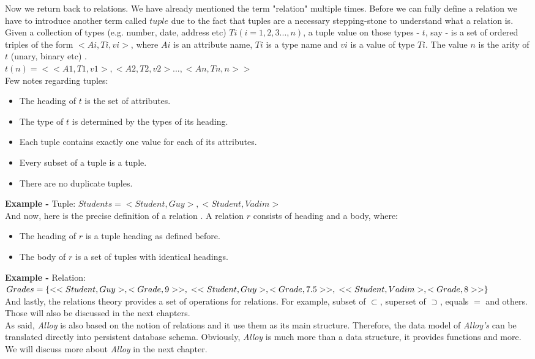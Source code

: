 \documentclass[oneside]{book}
\begin{document}
Now we return back to relations. We have already mentioned the term "relation" multiple times. Before we can fully define a relation we have to introduce another term called $tuple$ due to the fact that tuples are a necessary stepping-stone to understand what a relation is.  Given a collection of types (e.g. number, date, address etc) $Ti(i=1,2,3...,n)$, a tuple value on those types - $t$, say - is a set of ordered triples of the form $<Ai,Ti,vi>$, where $Ai$ is an attribute name, $Ti$ is a type name and $vi$ is a value of type $Ti$. The value $n$ is the arity of $t$ (unary, binary etc) \cite[p.~142]{introtodb}.\\
$t(n)=<<A1, T1, v1>, <A2, T2, v2>..., <An, Tn, n>>$\\
Few notes regarding tuples:
\begin{itemize}
	\item The heading of $t$ is the set of attributes.
	\item The type of $t$ is determined by the types of its heading.
	\item Each tuple contains exactly one value for each of its attributes.
	\item Every subset of a tuple is a tuple.
	\item There are no duplicate tuples.
\end{itemize}
\textbf{Example -} Tuple: $Students = {<Student, Guy>, <Student, Vadim>}$\\
And now, here is the precise definition of a relation \cite[p.~146]{introtodb}. A relation $r$ consists of heading and a body, where:
\begin{itemize}
	\item The heading of $r$ is a tuple heading as defined before.
	\item The body of $r$ is a set of tuples with identical headings.
\end{itemize}
\textbf{Example -} Relation: 
$Grades = \{<<Student, Guy>, <Grade, 9>>,\\
<<Student, Guy>, <Grade, 7.5>>,\\
<<Student, Vadim>, <Grade, 8>>\}$\\

And lastly, the relations theory provides a set of operations for relations. For example, subset of $\subset$, superset of $\supset$, equals $=$ and others. Those will also be discussed in the next chapters.\\

As said, \textit{Alloy} is also based on the notion of relations and it use them as its main structure. Therefore, the data model of \textit{Alloy's} can be translated directly into persistent database schema. Obviously, \textit{Alloy} is much more than a data structure, it provides functions and more. We will discuss more about \textit{Alloy} in the next chapter.\\
\end{document}
